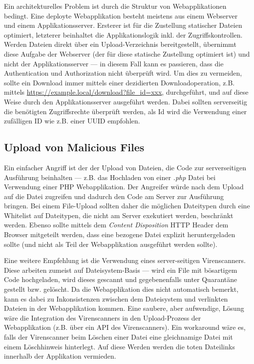 Ein architekturelles Problem ist durch die Struktur von Webapplikationen bedingt. Eine deployte Webapplikation besteht meistens aus einem Webserver und einem Applikationsserver. Ersterer ist für die Zustellung statischer Dateien optimiert, letzterer beinhaltet die Applikationslogik inkl. der Zugriffskontrollen. Werden Dateien direkt über ein Upload-Verzeichnis bereitgestellt, übernimmt diese Aufgabe der Webserver (der für diese statische Zustellung optimiert ist) und nicht der Applikationsserver --- in diesem Fall kann es passieren, dass die Authentication und Authorization nicht überprüft wird. Um dies zu vermeiden, sollte ein Download immer mittels einer dezidierten Downloadoperation, z.B. mittels \url{https://example.local/download?file_id=xxx}, durchgeführt, und auf diese Weise durch den Applikationsserver ausgeführt werden. Dabei sollten serverseitig die benötigten Zugriffsrechte überprüft werden, als Id wird die Verwendung einer zufälligen ID wie z.B. einer UUID empfohlen.

\subsection{Upload von Malicious Files}

Ein einfacher Angriff ist der der Upload von Dateien, die Code zur serverseitigen Ausführung beinhalten --- z.B. das Hochladen von einer \textit{.php} Datei bei Verwendung einer PHP Webapplikation. Der Angreifer würde nach dem Upload auf die Datei zugreifen und dadurch den Code am Server zur Ausführung bringen. Bei einem File-Upload sollten daher die möglichen Dateitypen durch eine Whitelist auf Dateitypen, die nicht am Server exekutiert werden, beschränkt werden. Ebenso sollte mittels dem \textit{Content Disposition} HTTP Header dem Browser mitgeteilt werden, dass eine bezogene Datei explizit heruntergeladen sollte (und nicht als Teil der Webapplikation ausgeführt werden sollte).

Eine weitere Empfehlung ist die Verwendung eines server-seitigen Virenscanners. Diese arbeiten zumeist auf Dateisystem-Basis --- wird ein File mit bösartigem Code hochgeladen, wird dieses gescannt und gegebenenfalls unter Quarantäne gestellt bzw. gelöscht. Da die Webapplikation dies nicht automatisch bemerkt, kann es dabei zu Inkonsistenzen zwischen dem Dateisystem und verlinkten Dateien in der Webapplikation kommen. Eine saubere, aber aufwendige, Lösung wäre die Integration des Virenscanners in den Upload-Prozess der Webapplikation (z.B. über ein API des Virenscanners). Ein workaround wäre es, falls der Virenscanner beim Löschen einer Datei eine gleichnamige Datei mit einem Löschhinweis hinterlegt. Auf diese Werden werden die toten Dateilinks innerhalb der Applikation vermieden.

